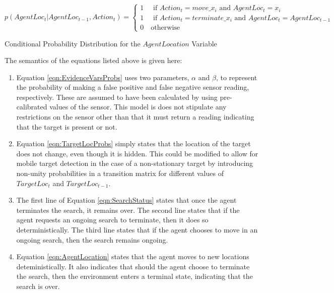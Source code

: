 \scriptsize
    \begin{equation}\label{eqn:AgentLocation}
        p(AgentLoc_t | AgentLoc_{t-1}, Action_{t}) = 
        \begin{cases}
        1 \quad \text{ if } Action_t = move\_x_i \text{ and } AgentLoc_t = x_i
        \\
        1 \quad \text{ if } Action_t = terminate\_x_i \text{ and } AgentLoc_t = AgentLoc_{t-1}
        \\
        0 \quad \text{otherwise}
        \end{cases}
    \end{equation}
\begin{center}
    \normalsize
    Conditional Probability Distribution for the $AgentLocation$ Variable
\end{center}

\normalsize
The semantics of the equations listed above is given here: 
\begin{enumerate}
    \item Equation \ref{eqn:EvidenceVarsProbs} uses two parameters, $\alpha$ and $\beta$, to represent the probability of making a false positive and false negative sensor reading, respectively. These are assumed to have been calculated by using pre-calibrated values of the sensor. This model is does not stipulate any restrictions on the sensor other than that it must return a reading indicating that the target is present or not.
    \item  Equation \ref{eqn:TargetLocProbs} simply states that the location of the target does not change, even though it is hidden. This could be modified to allow for mobile target detection in the case of a non-stationary target by introducing non-unity probabilities in a transition matrix for different values of $TargetLoc_t$ and $TargetLoc_{t-1}$.
    \item The first line of Equation \ref{eqn:SearchStatus} states that once the agent terminates the search, it remains over. The second line states that if the agent requests an ongoing search to terminate, then it does so deterministically. The third line states that if the agent chooses to move in an ongoing search, then the search remains ongoing.
    \item Equation \ref{eqn:AgentLocation} states that the agent moves to new locations deteministically. It also indicates that should the agent choose to terminate the search, then the environment enters a terminal state, indicating that the search is over.
\end{enumerate}


